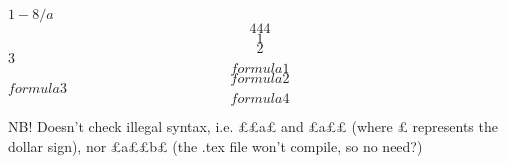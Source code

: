 \documentclass[11pt]{article}
\begin{document}
$1-8/a$
$$444$$
$$1$$$$2$$$3$
$$formula1$$$$formula2$$$formula3$$$formula4$$

NB! Doesn't check illegal syntax, i.e. ££a£ and £a££ (where £ represents the dollar sign), nor £a££b£ (the .tex file won't compile, so no need?)
\end{document}
